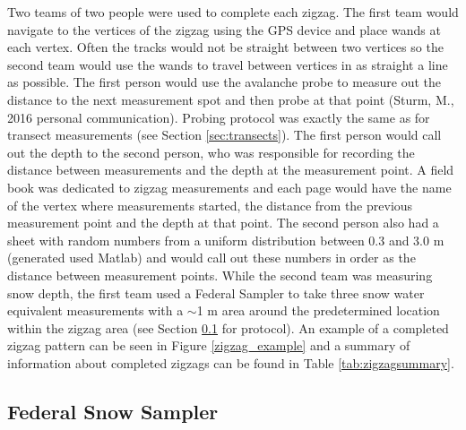 \documentclass{sfuthesis}
\begin{document}
Two teams of two people were used to complete each zigzag. The first team would navigate to the vertices of the zigzag using the GPS device and place wands at each vertex. Often the tracks would not be straight between two vertices so the second team would use the wands to travel between vertices in as straight a line as possible. The first person would use the avalanche probe to measure out the distance to the next measurement spot and then probe at that point (Sturm, M., 2016 personal communication). Probing protocol was exactly the same as for transect measurements (see Section \ref{sec:transects}). The first person would call out the depth to the second person, who was responsible for recording the distance between measurements and the depth at the measurement point. A field book was dedicated to zigzag measurements and each page would have the name of the vertex where measurements started, the distance from the previous measurement point and the depth at that point. The second person also had a sheet with random numbers from a uniform distribution between 0.3 and 3.0 m (generated used Matlab) and would call out these numbers in order as the distance between measurement points. While the second team was measuring snow depth, the first team used a Federal Sampler to take three snow water equivalent measurements with a $\sim$1 m area around the predetermined location within the zigzag area (see Section \ref{sec:SWE} for protocol). An example of a completed zigzag pattern can be seen in Figure \ref{zigzag_example} and a summary of information about completed zigzags can be found in Table \ref{tab:zigzagsummary}.  


 \subsection{Federal Snow Sampler}
\label{sec:SWE}
 
\end{document}
